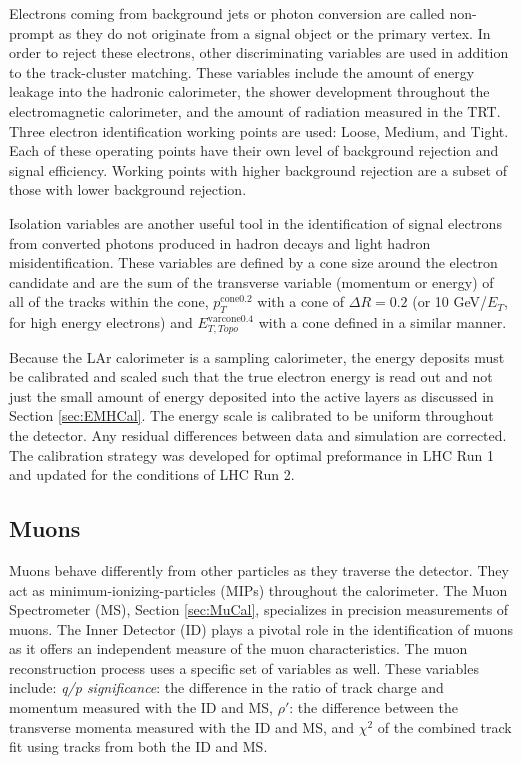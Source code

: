 Electrons coming from background jets or photon conversion are called non-prompt as they do not originate from a signal object or the primary vertex.  In order to reject these electrons, other discriminating variables are used in addition to the track-cluster matching.  These variables include the amount of energy leakage into the hadronic calorimeter, the shower development throughout the electromagnetic calorimeter, and the amount of radiation measured in the TRT.  Three electron identification working points are used: Loose, Medium, and Tight.  Each of these operating points have their own level of background rejection and signal efficiency.  Working points with higher background rejection are a subset of those with lower background rejection.

Isolation variables are another useful tool in the identification of signal electrons from converted photons produced in hadron decays and light hadron misidentification.  These variables are defined by a cone size around the electron candidate and are the sum of the transverse variable (momentum or energy) of all of the tracks within the cone, $p_{T}^{\text{cone0.2}}$ with a cone of $\Delta R =0.2$ (or 10 GeV/$E_T$, for high energy electrons) and $E_{T, Topo}^{\text{varcone0.4}}$ with a cone defined in a similar manner.  

Because the LAr calorimeter is a sampling calorimeter, the energy deposits must be calibrated and scaled such that the true electron energy is read out and not just the small amount of energy deposited into the active layers as discussed in Section \ref{sec:EMHCal}.  The energy scale is calibrated to be uniform throughout the detector.  Any residual differences between data and simulation are corrected.  The calibration strategy was developed for optimal preformance in LHC Run 1\cite{ElectronCalib1} and updated for the conditions of LHC Run 2\cite{ElectronCalib2}.

\subsection{Muons}
Muons behave differently from other particles as they traverse the detector.  They act as minimum-ionizing-particles (MIPs) throughout the calorimeter.  The Muon Spectrometer (MS), Section \ref{sec:MuCal}, specializes in precision measurements of muons.  The Inner Detector (ID) plays a pivotal role in the identification of muons as it offers an independent measure of the muon characteristics.  The muon reconstruction process uses a specific set of variables as well\cite{MuonID}.  These variables include: \textit{ q/p significance}: the difference in the ratio of track charge and momentum measured with the ID and MS, $\rho'$: the difference between the transverse momenta measured with the ID and MS, and $\chi^2$ of the combined track fit using tracks from both the ID and MS.


